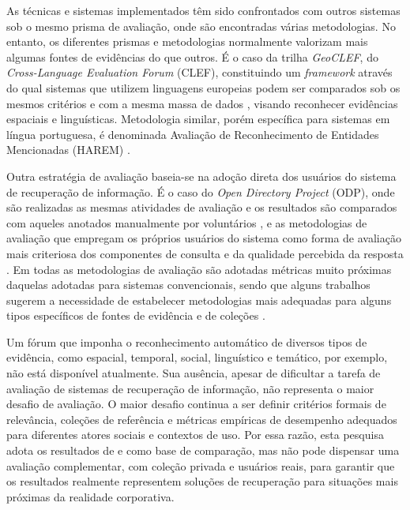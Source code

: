 As técnicas e sistemas implementados têm sido confrontados com outros sistemas sob o mesmo prisma de avaliação, onde são encontradas várias metodologias. No entanto, os diferentes prismas e metodologias normalmente valorizam mais algumas fontes de evidências do que outros. É o caso da trilha \textit{GeoCLEF}, do \textit{Cross-Language Evaluation Forum} (CLEF), constituindo um \textit{framework} através do qual sistemas que utilizem linguagens europeias podem ser comparados sob os mesmos critérios e com a mesma massa de dados \cite{domenech07,cardoso08,anastacio09}, visando reconhecer evidências espaciais e linguísticas. Metodologia similar, porém específica para sistemas em língua portuguesa, é denominada Avaliação de Reconhecimento de Entidades Mencionadas (HAREM) \cite{harem07}.

Outra estratégia de avaliação baseia-se na adoção direta dos usuários do sistema de recuperação de informação. É o caso do \textit{Open Directory Project} (ODP), onde são realizadas as mesmas atividades de avaliação e os resultados são comparados com aqueles anotados manualmente por voluntários \cite{amitay04}, e as metodologias de avaliação que empregam os próprios usuários do sistema como forma de avaliação mais criteriosa dos componentes de consulta e da qualidade percebida da resposta \cite{bucher05,yuCai07,pontes13}. Em todas as metodologias de avaliação são adotadas métricas muito próximas daquelas adotadas para sistemas convencionais, sendo que alguns trabalhos sugerem a necessidade de estabelecer metodologias mais adequadas para alguns tipos específicos de fontes de evidência e de coleções \cite{domenech07,sakai08ret}.

Um fórum que imponha o reconhecimento automático de diversos tipos de evidência, como espacial, temporal, social, linguístico e temático, por exemplo, não está disponível atualmente. Sua ausência, apesar de dificultar a tarefa de avaliação de sistemas de recuperação de informação, não representa o maior desafio de avaliação. O maior desafio continua a ser definir critérios formais de relevância, coleções de referência e métricas empíricas de desempenho adequados para diferentes atores sociais e contextos de uso. Por essa razão, esta pesquisa adota os resultados de  e  como base de comparação, mas não pode dispensar uma avaliação complementar, com coleção privada e usuários reais, para garantir que os resultados realmente representem soluções de recuperação para situações mais próximas da realidade corporativa.

